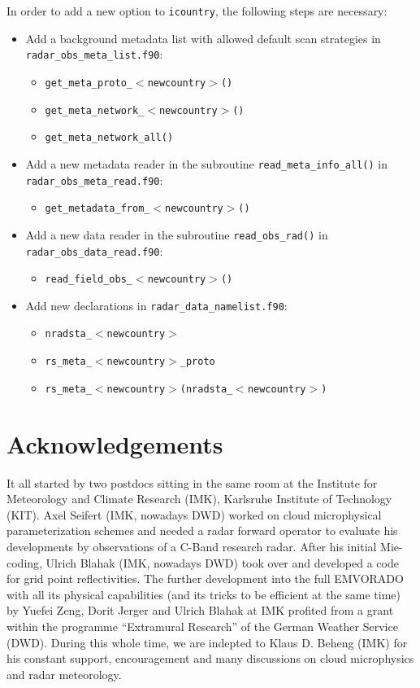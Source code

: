 \documentclass[10pt,a4paper,twoside,headinclude,footinclude,parskip=half]{scrartcl}
\newcommand{\srcform}[1]{\mbox{\texttt{#1}}\xspace}%
\begin{document}
In order to add a new option to \srcform{icountry}, the following steps are necessary:
\begin{itemize}
\item Add a background metadata list with allowed default scan strategies in \srcform{radar_obs_meta_list.f90}:
  \begin{itemize}
  \item \srcform{get_meta_proto_$<$newcountry$>$()}
  \item \srcform{get_meta_network_$<$newcountry$>$()}
  \item \srcform{get_meta_network_all()}
  \end{itemize}
\item Add a new metadata reader in the subroutine \srcform{read_meta_info_all()} in  \srcform{radar_obs_meta_read.f90}:
  \begin{itemize}
  \item \srcform{get_metadata_from_$<$newcountry$>$()}
  \end{itemize}
\item Add a new data reader in the subroutine \srcform{read_obs_rad()} in \srcform{radar_obs_data_read.f90}:
  \begin{itemize}
  \item \srcform{read_field_obs_$<$newcountry$>$()}
  \end{itemize}
\item Add new declarations in \srcform{radar_data_namelist.f90}:
  \begin{itemize}
  \item \srcform{nradsta_$<$newcountry$>$}
  \item \srcform{rs_meta_$<$newcountry$>$_proto}
  \item \srcform{rs_meta_$<$newcountry$>$(nradsta_$<$newcountry$>$)}
  \end{itemize}
\end{itemize}

\clearpage

\section{Acknowledgements}

It all started by two postdocs sitting in the same room at the Institute for Meteorology and Climate Research (IMK), Karlsruhe Institute of Technology (KIT).
Axel Seifert (IMK, nowadays DWD) worked on cloud microphysical parameterization schemes and needed a radar forward operator
to evaluate his developments by observations of a C-Band research radar. After his initial Mie-coding, Ulrich Blahak (IMK, nowadays DWD) took over and developed a code for grid point reflectivities.
The further development into the full EMVORADO with all its physical capabilities (and its tricks to be efficient at the same time) by Yuefei Zeng, Dorit Jerger and Ulrich Blahak at IMK
profited from a grant within the programme ``Extramural Research'' of the German Weather Service (DWD). During this whole time, we are indepted to Klaus D. Beheng (IMK) for his constant support, encouragement and many discussions
on cloud microphysics and radar meteorology.
\end{document}

